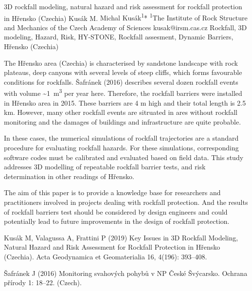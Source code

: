 \abstract
{3D rockfall modeling, natural hazard and risk assessment for rockfall protection in Hřensko (Czechia)} 
{Kusák M.} 
{Michal Kusák\textsuperscript{1}*} 
{\POtag} 
{
	\textsuperscript{1}The Institute of Rock Structure and Mechanics of the Czech Academy of Sciences
}
{kusak@irsm.cas.cz}  %
{Rockfall, 3D modeling, Hazard, Risk, HY-STONE, Rockfall assesment, Dynamic Barriers, Hřensko (Czechia)}
{The Hřensko area (Czechia) is characterised by sandstone landscape with rock plateaus, deep canyons with several levels of steep cliffs, which forms favourable conditions for rockfalls. Šafránek (2016) describes several dozen rockfall events with volume \textasciitilde1~m\textsuperscript{3} per year here. Therefore, the rockfall barriers were installed in Hřensko area in 2015. These barriers are 4 m high and their total length is 2.5 km. However, many other rockfall events are sitruated in ares without rockfall monitoring and the damages of buildings and infrastructure are quite probable. 

In these cases, the numerical simulations of rockfall trajectories are a standard procedure for evaluating rockfall hazards. For these simulations, corresponding software codes must be calibrated and evaluated based on field data. This study addresses 3D modelling of repeatable rockfall barrier tests, and risk determination in other readings of Hřensko.

The aim of this paper is to provide a knowledge base for researchers and practitioners involved in projects dealing with rockfall protection. And the results of rockfall barriers test should be considered by design engineers and could potentially lead to future improvements in the design of rockfall protection.
}
{Kusák M, Valagussa A, Frattini P (2019) Key Issues in 3D Rockfall Modeling, Natural Hazard and Risk Assessment for Rockfall Protection in Hřensko (Czechia). Acta Geodynamica et Geomaterialia 16, 4(196): 393–408.

Šafránek J (2016) Monitoring svahových pohybů v NP České Švýcarsko. Ochrana přírody 1: 18–22. (Czech).
}

